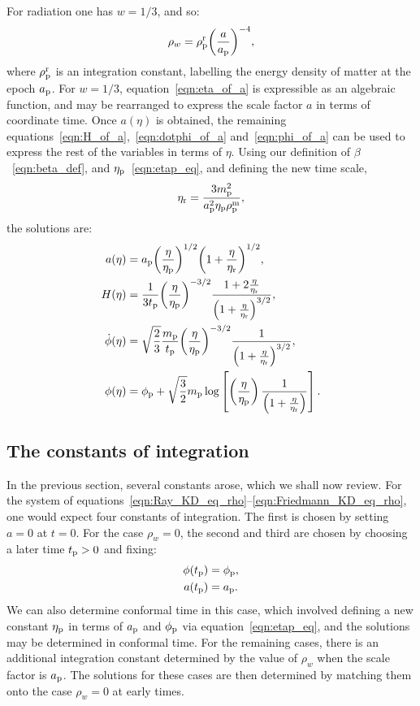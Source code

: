For radiation one has \(w=1/3\), and so:
\begin{equation}
  \rho_w = \rho_{\mathrm{p}}^{\mathrm{r}}{\left(\frac{a}{a_{\mathrm{p}}}\right)}^{-4},
\end{equation}
where \(\rho_{\mathrm{p}}^{\mathrm{r}}\) is an integration constant, labelling the energy density of matter at the epoch \(a_{\mathrm{p}}\).  For \(w=1/3\), equation~\eqref{eqn:eta_of_a} is expressible as an algebraic function, and may be rearranged to express the scale factor \(a\) in terms of coordinate time. Once \(a(\eta)\) is obtained, the remaining equations~\eqref{eqn:H_of_a},~\eqref{eqn:dotphi_of_a} and~\eqref{eqn:phi_of_a} can be used to express the rest of the variables in terms of \(\eta\). Using our definition of \(\beta\)~\eqref{eqn:beta_def}, and \(\eta_{\mathrm{p}}\)~\eqref{eqn:etap_eq}, and defining the new time scale,
\begin{equation}
  \eta_{\mathrm{r}} = \frac{3m_{\mathrm{p}}^2}{a_{\mathrm{p}}^2\eta_{\mathrm{p}}\rho_{\mathrm{p}}^{\mathrm{m}}},
  \label{eqn:etar}
\end{equation}
the solutions are:
\begin{align}
  a(\eta)
  &=
  a_{\mathrm{p}}{\left(\frac{\eta}{\eta_{\mathrm{p}}}\right)}^{1/2}
  {\left({1+\frac{\eta}{\eta_{\mathrm{r}}}}\right)}^{1/2},
  \\
  H(\eta) 
  &= 
  \frac{1}{3t_{\mathrm{p}}}{\left(\frac{\eta}{\eta_{\mathrm{p}}}\right)}^{-3/2}
  \frac{1+ 2\frac{\eta}{\eta_{\mathrm{r}}}}
  {{\left(1+ \frac{\eta}{\eta_{\mathrm{r}}}\right)}^{3/2}},
  \\
  \dot{\phi}(\eta) 
  &=
  \sqrt{\frac{2}{3}}\frac{m_{\mathrm{p}}}{t_{\mathrm{p}}}
  {\left(\frac{\eta}{\eta_{\mathrm{p}}}\right)}^{-3/2}
  \frac{1}{{\left(1+ \frac{\eta}{\eta_{\mathrm{r}}}\right)}^{3/2}},
  \\ 
  \phi(\eta) 
  &=
  \phi_{\mathrm{p}}+\sqrt {\frac{3}{2}}m_{\mathrm{p}}\log  
  \left[
  \left(\frac{\eta}{\eta_{\mathrm{p}}}\right)
  \frac {1}{\left(1+ \frac{\eta}{\eta_{\mathrm{r}}}\right)} 
  \right].
\end{align}

\subsection{The constants of integration}
\label{sec:constants}
In the previous section, several constants arose, which we shall now review. For the system of equations~\eqref{eqn:Ray_KD_eq_rho}--\eqref{eqn:Friedmann_KD_eq_rho}, one would expect four constants of integration. The first is chosen by setting \(a=0\) at \(t=0\). For the case \(\rho_w=0\), the second and third are chosen by choosing a later time \(t_{\mathrm{p}}>0\) and fixing:
\begin{align}
  \phi(t_{\mathrm{p}}) &= \phi_{\mathrm{p}} \nonumber,\\
  a(t_{\mathrm{p}}) &= a_{\mathrm{p}} \nonumber.
\end{align}
We can also determine conformal time in this case, which involved defining a new constant \(\eta_{\mathrm{p}}\) in terms of \(a_{\mathrm{p}}\) and \(\phi_{\mathrm{p}}\) via equation~\eqref{eqn:etap_eq}, and the solutions may be determined in conformal time. For the remaining cases, there is an additional integration constant determined by the value of \(\rho_w\) when the scale factor is \(a_{\mathrm{p}}\). The solutions for these cases are then determined by matching them onto the case \(\rho_w=0\) at early times.

